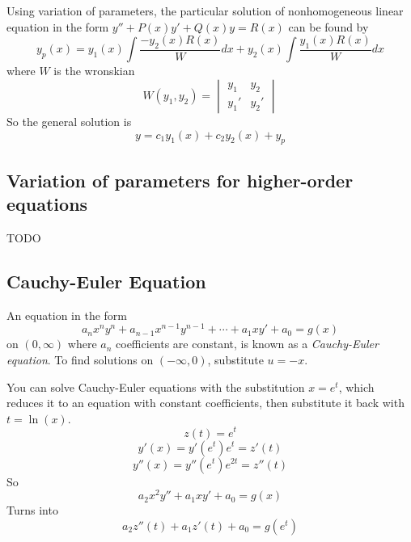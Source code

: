 Using variation of parameters, the particular solution of nonhomogeneous linear equation in the form $y'' + P(x)y' + Q(x)y = R(x)$ can be found by
\[
    y_p(x) = y_1(x) \int \frac{-y_2(x) R(x)}{W}dx + y_2(x) \int \frac{y_1(x) R(x)}{W}dx
\]
where $W$ is the wronskian
\[
    W(y_1, y_2) = \begin{vmatrix}
        y_1 & y_2 \\
        y_1' & y_2'
    \end{vmatrix}
\]
So the general solution is
\[
    y = c_1 y_1(x) + c_2 y_2(x) + y_p
\]

\subsection{Variation of parameters for higher-order equations}

TODO

\subsection{Cauchy-Euler Equation}

\begin{definition}
    An equation in the form
    \[
        a_n x^n y^n + a_{n - 1} x^{n - 1} y^{n - 1} + \cdots + a_1 x y' + a_0 = g(x)
    \]
    on $(0, \infty)$ where $a_n$ coefficients are constant, is known as a \textit{Cauchy-Euler equation}. To find solutions on $(-\infty, 0)$, substitute $u = -x$.
\end{definition}

You can solve Cauchy-Euler equations with the substitution $x = e^t$, which reduces it to an equation with constant coefficients, then substitute it back with $t = \ln(x)$.
\[
    z(t) = e^t
\]
\[
    y'(x) = y'(e^t) e^t = z'(t)
\]
\[
    y''(x) = y''(e^t) e^{2t} = z''(t)
\]
So
\[
    a_2 x^2 y'' + a_1 x y' + a_0 = g(x)
\]
Turns into
\[
    a_2 z''(t) + a_1 z'(t) + a_0 = g(e^t)
\]